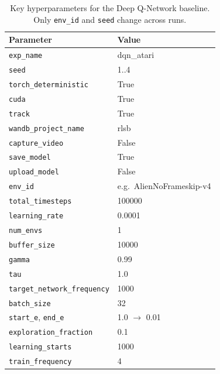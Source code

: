 \begin{table}
	\caption{Key hyperparameters for the Deep Q-Network baseline. Only \texttt{env\_id} and \texttt{seed} change across runs.}
	\label{tab:dqn_hyperparams}
	\centering
	\begin{tabular}{ll}
		\toprule
		\textbf{Parameter} & \textbf{Value} \\
		\midrule
		\texttt{exp\_name}                & dqn\_atari \\
		\texttt{seed}                     & 1..4 \\
		\texttt{torch\_deterministic}     & True \\
		\texttt{cuda}                     & True \\
		\texttt{track}                    & True \\
		\texttt{wandb\_project\_name}     & rlsb \\
		\texttt{capture\_video}           & False \\
		\texttt{save\_model}              & True \\
		\texttt{upload\_model}            & False \\
		\texttt{env\_id}                  & e.g.\ AlienNoFrameskip-v4 \\
		\texttt{total\_timesteps}         & 100000 \\
		\texttt{learning\_rate}           & 0.0001 \\
		\texttt{num\_envs}                & 1 \\
		\texttt{buffer\_size}             & 10000 \\
		\texttt{gamma}                    & 0.99 \\
		\texttt{tau}                      & 1.0 \\
		\texttt{target\_network\_frequency} & 1000 \\
		\texttt{batch\_size}             & 32 \\
		\texttt{start\_e}, \texttt{end\_e} & 1.0 $\to$ 0.01 \\
		\texttt{exploration\_fraction}    & 0.1 \\
		\texttt{learning\_starts}         & 1000 \\
		\texttt{train\_frequency}         & 4 \\
		\bottomrule
	\end{tabular}
\end{table}

